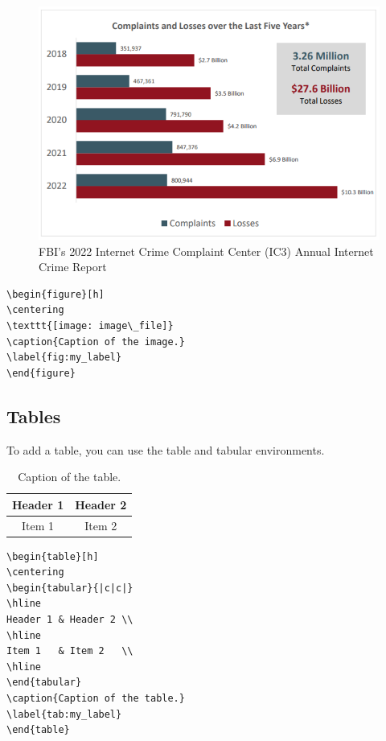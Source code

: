 \begin{figure}[ht]
    \centering
    \includegraphics[width=350pt]{images/ic3_annual.png}
    \caption{FBI's 2022 Internet Crime Complaint Center (IC3) Annual Internet Crime Report}
    \label{fig:ice3_annual}
\end{figure}

\begin{verbatim}
\begin{figure}[h]
\centering
\texttt{[image: image\_file]}
\caption{Caption of the image.}
\label{fig:my_label}
\end{figure}
\end{verbatim}

\subsection{Tables}
To add a table, you can use the table and tabular environments.

\begin{table}[ht]
\centering
\begin{tabular}{|c|c|}
\hline
Header 1 & Header 2 \\
\hline
Item 1   & Item 2   \\
\hline
\end{tabular}
\caption{Caption of the table.}
\label{tab:my_label}
\end{table}



\begin{verbatim}
\begin{table}[h]
\centering
\begin{tabular}{|c|c|}
\hline
Header 1 & Header 2 \\
\hline
Item 1   & Item 2   \\
\hline
\end{tabular}
\caption{Caption of the table.}
\label{tab:my_label}
\end{table}
\end{verbatim}

